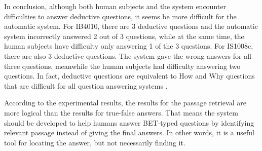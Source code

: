 In conclusion, although both human subjects and the system encounter difficulties to answer deductive questions, it seems be more difficult for the automatic system. For IB4010, there are 3 deductive questions and the automatic system incorrectly answered 2 out of 3 questions, while at the same time, the human subjects have difficulty only answering 1 of the 3 questions. For IS1008c, there are also 3 deductive questions. The system gave the wrong answers for all three questions, meanwhile the human subjects had difficulty answering two questions. In fact, deductive questions are equivalent to How and Why questions that are difficult for all question answering systems \cite{prager2000qap, brill2002diq}.

According to the experimental results, the results for the passage retrieval are more logical than the results for true-false answers. That means the system should be developed to help humans answer BET-typed questions by identifying relevant passage instead of giving the final answers. In other words, it is a useful tool for locating the answer, but not necessarily finding it.
 

\newpage





